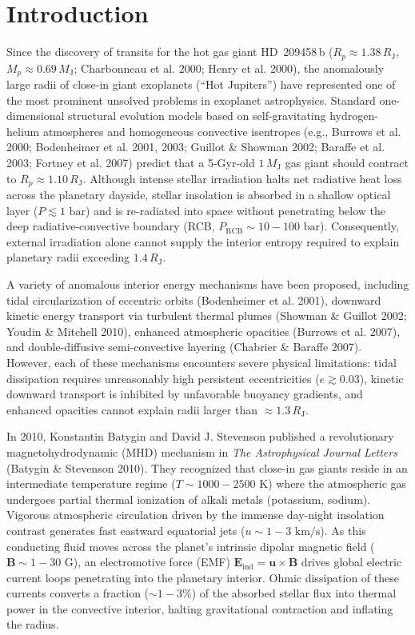 \documentclass[11pt,a4paper]{article}
\begin{document}
\section{Introduction}
Since the discovery of transits for the hot gas giant HD~209458\,b ($R_p \approx 1.38\,R_{\mathrm{J}}$, $M_p \approx 0.69\,M_{\mathrm{J}}$; Charbonneau et al. 2000; Henry et al. 2000), the anomalously large radii of close-in giant exoplanets (``Hot Jupiters'') have represented one of the most prominent unsolved problems in exoplanet astrophysics. Standard one-dimensional structural evolution models based on self-gravitating hydrogen-helium atmospheres and homogeneous convective isentropes (e.g., Burrows et al. 2000; Bodenheimer et al. 2001, 2003; Guillot \& Showman 2002; Baraffe et al. 2003; Fortney et al. 2007) predict that a 5-Gyr-old $1\,M_{\mathrm{J}}$ gas giant should contract to $R_p \approx 1.10\,R_{\mathrm{J}}$. Although intense stellar irradiation halts net radiative heat loss across the planetary dayside, stellar insolation is absorbed in a shallow optical layer ($P \lesssim 1\text{ bar}$) and is re-radiated into space without penetrating below the deep radiative-convective boundary (RCB, $P_{\mathrm{RCB}} \sim 10 - 100\text{ bar}$). Consequently, external irradiation alone cannot supply the interior entropy required to explain planetary radii exceeding $1.4\,R_{\mathrm{J}}$.

A variety of anomalous interior energy mechanisms have been proposed, including tidal circularization of eccentric orbits (Bodenheimer et al. 2001), downward kinetic energy transport via turbulent thermal plumes (Showman \& Guillot 2002; Youdin \& Mitchell 2010), enhanced atmospheric opacities (Burrows et al. 2007), and double-diffusive semi-convective layering (Chabrier \& Baraffe 2007). However, each of these mechanisms encounters severe physical limitations: tidal dissipation requires unreasonably high persistent eccentricities ($e \gtrsim 0.03$), kinetic downward transport is inhibited by unfavorable buoyancy gradients, and enhanced opacities cannot explain radii larger than $\approx 1.3\,R_{\mathrm{J}}$.

In 2010, Konstantin Batygin and David J. Stevenson published a revolutionary magnetohydrodynamic (MHD) mechanism in \textit{The Astrophysical Journal Letters} (Batygin \& Stevenson 2010). They recognized that close-in gas giants reside in an intermediate temperature regime ($T \sim 1000 - 2500\text{ K}$) where the atmospheric gas undergoes partial thermal ionization of alkali metals (potassium, sodium). Vigorous atmospheric circulation driven by the immense day-night insolation contrast generates fast eastward equatorial jets ($u \sim 1 - 3\text{ km/s}$). As this conducting fluid moves across the planet's intrinsic dipolar magnetic field ($\mathbf{B} \sim 1 - 30\text{ G}$), an electromotive force (EMF) $\mathbf{E}_{\mathrm{ind}} = \mathbf{u} \times \mathbf{B}$ drives global electric current loops penetrating into the planetary interior. Ohmic dissipation of these currents converts a fraction ($\sim 1 - 3\%$) of the absorbed stellar flux into thermal power in the convective interior, halting gravitational contraction and inflating the radius.
\end{document}
